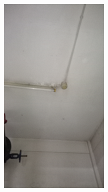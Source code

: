\begin{figure}
\begin{minipage}[b]{0.2\linewidth}
		\includegraphics[width=\textwidth]{figures/fig_ch04_fdas_sm04}
\end{minipage}
	\hspace{0.05cm}
\begin{minipage}[b]{0.2\linewidth}
	\centering

\end{minipage}
\end{figure}
